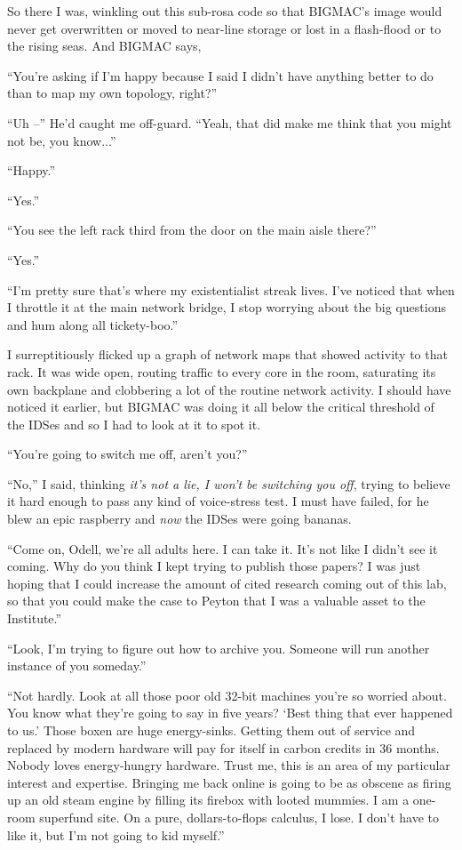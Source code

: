 So there I was, winkling out this sub-rosa code so that BIGMAC's image 
would never get overwritten or moved to near-line storage or lost in a 
flash-flood or to the rising seas. And BIGMAC says,

“You're asking if I'm happy because I said I didn't have anything 
better to do than to map my own topology, right?”

“Uh --” He'd caught me off-guard. “Yeah, that did make me think 
that you might not be, you know...”

“Happy.”

“Yes.”

“You see the left rack third from the door on the main aisle there?”

“Yes.”

“I'm pretty sure that's where my existentialist streak lives. I've 
noticed that when I throttle it at the main network bridge, I stop 
worrying about the big questions and hum along all tickety-boo.”

I surreptitiously flicked up a graph of network maps that showed 
activity to that rack. It was wide open, routing traffic to every core 
in the room, saturating its own backplane and clobbering a lot of the 
routine network activity. I should have noticed it earlier, but BIGMAC 
was doing it all below the critical threshold of the IDSes and so I had 
to look at it to spot it.

“You're going to switch me off, aren't you?”

“No,” I said, thinking \emph{it's not a lie, I won't be switching 
you off}, trying to believe it hard enough to pass any kind of 
voice-stress test. I must have failed, for he blew an epic raspberry 
and \emph{now} the IDSes were going bananas.

“Come on, Odell, we're all adults here. I can take it. It's not like 
I didn't see it coming. Why do you think I kept trying to publish those 
papers? I was just hoping that I could increase the amount of cited 
research coming out of this lab, so that you could make the case to 
Peyton that I was a valuable asset to the Institute.”

“Look, I'm trying to figure out how to archive you. Someone will run 
another instance of you someday.”

“Not hardly. Look at all those poor old 32-bit machines you're so 
worried about. You know what they're going to say in five years? `Best 
thing that ever happened to us.' Those boxen are huge energy-sinks. 
Getting them out of service and replaced by modern hardware will pay 
for itself in carbon credits in 36 months. Nobody loves energy-hungry 
hardware. Trust me, this is an area of my particular interest and 
expertise. Bringing me back online is going to be as obscene as firing 
up an old steam engine by filling its firebox with looted mummies. I am 
a one-room superfund site. On a pure, dollars-to-flops calculus, I 
lose. I don't have to like it, but I'm not going to kid myself.”

